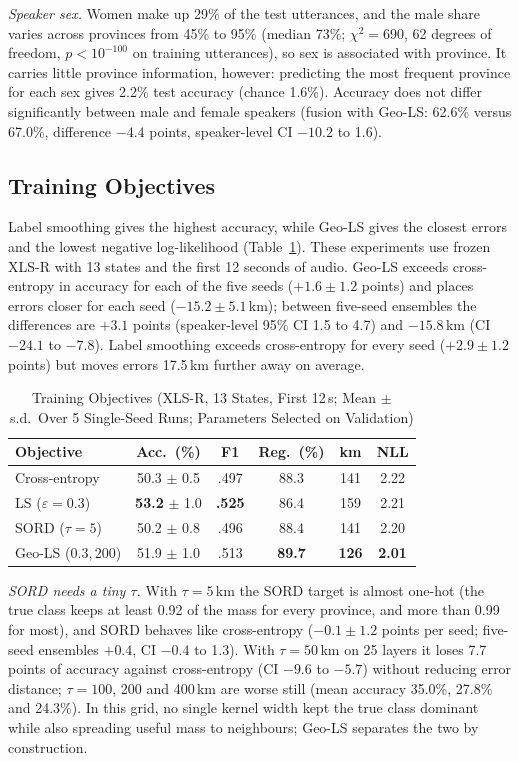 \documentclass[conference]{IEEEtran}
\begin{document}
\textit{Speaker sex.} Women make up 29\% of the test utterances, and the male share varies across provinces from 45\% to 95\% (median 73\%; $\chi^2 = 690$, 62 degrees of freedom, $p < 10^{-100}$ on training utterances), so sex is associated with province. It carries little province information, however: predicting the most frequent province for each sex gives 2.2\% test accuracy (chance 1.6\%). Accuracy does not differ significantly between male and female speakers (fusion with Geo-LS: 62.6\% versus 67.0\%, difference $-4.4$ points, speaker-level CI $-10.2$ to 1.6).

\subsection{Training Objectives}
\label{sec:obj}
Label smoothing gives the highest accuracy, while Geo-LS gives the closest errors and the lowest negative log-likelihood (Table~\ref{tab:obj}). These experiments use frozen XLS-R with 13 states and the first 12 seconds of audio. Geo-LS exceeds cross-entropy in accuracy for each of the five seeds ($+1.6 \pm 1.2$ points) and places errors closer for each seed ($-15.2 \pm 5.1$\,km); between five-seed ensembles the differences are $+3.1$ points (speaker-level 95\% CI 1.5 to 4.7) and $-15.8$\,km (CI $-24.1$ to $-7.8$). Label smoothing exceeds cross-entropy for every seed ($+2.9 \pm 1.2$ points) but moves errors 17.5\,km further away on average.

\begin{table}[t]
\centering
\caption{Training Objectives (XLS-R, 13 States, First 12\,s; Mean $\pm$ s.d.\ Over 5 Single-Seed Runs; Parameters Selected on Validation)}
\label{tab:obj}
\setlength{\tabcolsep}{3pt}
\begin{tabular}{@{}lccccc@{}}
\toprule
Objective & Acc.\ (\%) & F1 & Reg.\ (\%) & km & NLL \\
\midrule
Cross-entropy & 50.3 $\pm$ 0.5 & .497 & 88.3 & 141 & 2.22 \\
LS ($\varepsilon{=}0.3$) & \textbf{53.2} $\pm$ 1.0 & \textbf{.525} & 86.4 & 159 & 2.21 \\
SORD ($\tau{=}5$) & 50.2 $\pm$ 0.8 & .496 & 88.4 & 141 & 2.20 \\
Geo-LS ($0.3, 200$) & 51.9 $\pm$ 1.0 & .513 & \textbf{89.7} & \textbf{126} & \textbf{2.01} \\
\bottomrule
\end{tabular}
\end{table}

\textit{SORD needs a tiny $\tau$.} With $\tau = 5$\,km the SORD target is almost one-hot (the true class keeps at least 0.92 of the mass for every province, and more than 0.99 for most), and SORD behaves like cross-entropy ($-0.1 \pm 1.2$ points per seed; five-seed ensembles $+0.4$, CI $-0.4$ to 1.3). With $\tau = 50$\,km on 25 layers it loses 7.7 points of accuracy against cross-entropy (CI $-9.6$ to $-5.7$) without reducing error distance; $\tau = 100$, 200 and 400\,km are worse still (mean accuracy 35.0\%, 27.8\% and 24.3\%). In this grid, no single kernel width kept the true class dominant while also spreading useful mass to neighbours; Geo-LS separates the two by construction.
\end{document}
